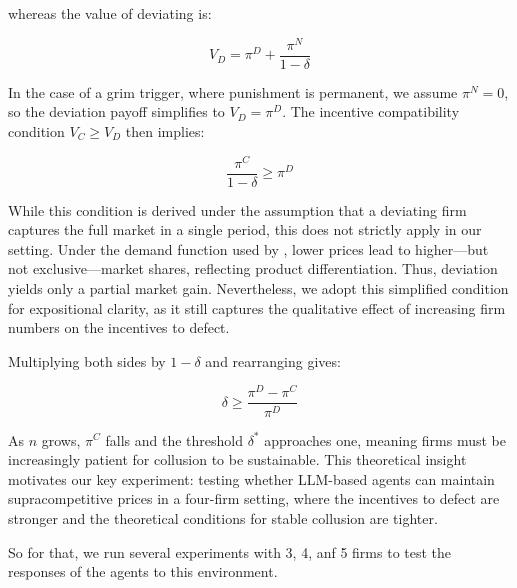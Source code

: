 whereas the value of deviating is:

$$V_D = \pi^D + \frac{\pi^N}{1 - \delta}$$

In the case of a grim trigger, where punishment is permanent, we assume $\pi^N = 0$, so the deviation payoff simplifies to $V_D = \pi^D$. The incentive compatibility condition $V_C \geq V_D$ then implies:

$$\frac{\pi^C}{1 - \delta} \geq \pi^D$$

While this condition is derived under the assumption that a deviating firm captures the full market in a single period, this does not strictly apply in our setting. Under the demand function used by \textcite{calvano_artificial_2020}, lower prices lead to higher—but not exclusive—market shares, reflecting product differentiation. Thus, deviation yields only a partial market gain. Nevertheless, we adopt this simplified condition for expositional clarity, as it still captures the qualitative effect of increasing firm numbers on the incentives to defect.

Multiplying both sides by $1 - \delta$ and rearranging gives:

$$\delta \geq \frac{\pi^D - \pi^C}{\pi^D}$$

As $n$ grows, $\pi^C$ falls and the threshold $\delta^*$ approaches one, meaning firms must be increasingly patient for collusion to be sustainable. This theoretical insight motivates our key experiment: testing whether LLM-based agents can maintain supracompetitive prices in a four-firm setting, where the incentives to defect are stronger and the theoretical conditions for stable collusion are tighter.


So for that, we run several experiments with 3, 4, anf 5 firms to test the responses of the agents to this environment.





